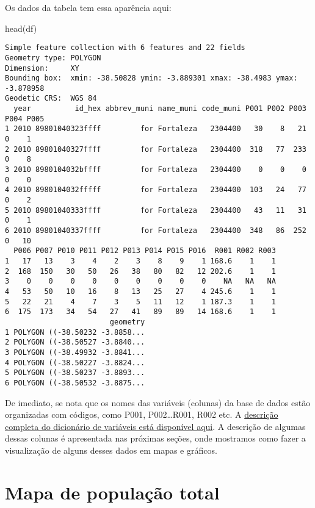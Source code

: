 \documentclass[
  letterpaper,
  DIV=11,
  numbers=noendperiod]{scrreprt}
\newenvironment{Shaded}{\begin{snugshade}}{\end{snugshade}}
\newcommand{\FunctionTok}[1]{\textcolor[rgb]{0.28,0.35,0.67}{#1}}
\newcommand{\NormalTok}[1]{\textcolor[rgb]{0.00,0.23,0.31}{#1}}
\begin{document}
Os dados da tabela tem essa aparência aqui:

\begin{Shaded}
\begin{Highlighting}[]
\FunctionTok{head}\NormalTok{(df)}
\end{Highlighting}
\end{Shaded}

\begin{verbatim}
Simple feature collection with 6 features and 22 fields
Geometry type: POLYGON
Dimension:     XY
Bounding box:  xmin: -38.50828 ymin: -3.889301 xmax: -38.4983 ymax: -3.878958
Geodetic CRS:  WGS 84
  year          id_hex abbrev_muni name_muni code_muni P001 P002 P003 P004 P005
1 2010 89801040323ffff         for Fortaleza   2304400   30    8   21    0    1
2 2010 89801040327ffff         for Fortaleza   2304400  318   77  233    0    8
3 2010 8980104032bffff         for Fortaleza   2304400    0    0    0    0    0
4 2010 8980104032fffff         for Fortaleza   2304400  103   24   77    0    2
5 2010 89801040333ffff         for Fortaleza   2304400   43   11   31    0    1
6 2010 89801040337ffff         for Fortaleza   2304400  348   86  252    0   10
  P006 P007 P010 P011 P012 P013 P014 P015 P016  R001 R002 R003
1   17   13    3    4    2    3    8    9    1 168.6    1    1
2  168  150   30   50   26   38   80   82   12 202.6    1    1
3    0    0    0    0    0    0    0    0    0    NA   NA   NA
4   53   50   10   16    8   13   25   27    4 245.6    1    1
5   22   21    4    7    3    5   11   12    1 187.3    1    1
6  175  173   34   54   27   41   89   89   14 168.6    1    1
                        geometry
1 POLYGON ((-38.50232 -3.8858...
2 POLYGON ((-38.50527 -3.8840...
3 POLYGON ((-38.49932 -3.8841...
4 POLYGON ((-38.50227 -3.8824...
5 POLYGON ((-38.50237 -3.8893...
6 POLYGON ((-38.50532 -3.8875...
\end{verbatim}

De imediato, se nota que os nomes das variáveis (colunas) da base de
dados estão organizadas com códigos, como P001, P002\ldots R001, R002
etc. A
\href{https://ipeagit.github.io/aopdata/articles/data_dic_pt.html}{descrição
completa do dicionário de variáveis está disponível aqui}. A descrição
de algumas dessas colunas é apresentada nas próximas seções, onde
mostramos como fazer a visualização de alguns desses dados em mapas e
gráficos.

\hypertarget{mapa-de-populauxe7uxe3o-total}{%
\section{Mapa de população total}\label{mapa-de-populauxe7uxe3o-total}}
\end{document}
